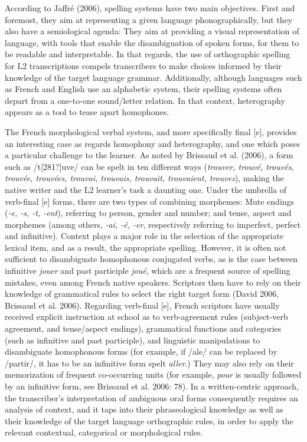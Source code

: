 \documentclass[11pt]{article}
\newenvironment{styleStandard}{\renewcommand\baselinestretch{1.0}\setlength\leftskip{0cm}\setlength\rightskip{0cm plus 1fil}\setlength\parindent{0cm}\setlength\parfillskip{0pt plus 1fil}\setlength\parskip{0in plus 1pt}\writerlistparindent\writerlistleftskip\leavevmode\normalfont\normalsize\writerlistlabel\ignorespaces}{\unskip\vspace{0.111in plus 0.0111in}\par}
\newcommand\writerlistleftskip{}
\newcommand\writerlistparindent{}
\newcommand\writerlistlabel{}
\begin{document}
\begin{styleStandard}
According to Jaffré (2006), spelling systems have two main objectives. First and foremost, they aim at representing a given language phonographically, but they also have a semiological agenda: They aim at providing a visual representation of language, with tools that enable the disambiguation of spoken forms, for them to be readable and interpretable. In that regards, the use of orthographic spelling for L2 transcriptions compels transcribers to make choices informed by their knowledge of the target language grammar. Additionally, although languages such as French and English use an alphabetic system, their spelling systems often depart from a one-to-one sound/letter relation. In that context, heterography appears as a tool to tease apart homophones. 
\end{styleStandard}

\begin{styleStandard}
The French morphological verbal system, and more specifically final [e], provides an interesting case as regards homophony and heterography, and one which poses a particular challenge to the learner. As noted by Brissaud et al. (2006), a form such as /t[281?]uve/ can be spelt in ten different ways (\textit{trouver, trouvé, trouvés, trouvée, trouvées, trouvai, trouvais, trouvait, trouvaient, trouvez}), making the native writer and the L2 learner’s task a daunting one. Under the umbrella of verb-final [e] forms, there are two types of combining morphemes: Mute endings (\textit{{}-e, -s, -t, -ent}), referring to person, gender and number; and tense, aspect and morphemes (among others, \textit{{}-ai, -é, -er}, respectively referring to imperfect, perfect and infinitive). Context plays a major role in the selection of the appropriate lexical item, and as a result, the appropriate spelling. However, it is often not sufficient to disambiguate homophonous conjugated verbs, as is the case between infinitive \textit{jouer} and past participle \textit{joué}, which are a frequent source of spelling mistakes, even among French native speakers. Scriptors then have to rely on their knowledge of grammatical rules to select the right target form (David 2006, Brissaud et al. 2006). Regarding verb-final [e], French scriptors have usually received explicit instruction at school as to verb-agreement rules (subject-verb agreement, and tense/aspect endings), grammatical functions and categories (such as infinitive and past participle), and linguistic manipulations to disambiguate homophonous forms (for example, if /ale/ can be replaced by /partir/, it has to be an infinitive form spelt \textit{aller}.) They may also rely on their memorization of frequent co-occurring units (for example, \textit{pour} is usually followed by an infinitive form, see Brissaud et al. 2006: 78). In a written-centric approach, the transcriber’s interpretation of ambiguous oral forms consequently requires an analysis of context, and it taps into their phraseological knowledge as well as their knowledge of the target language orthographic rules, in order to apply the relevant contextual, categorical or morphological rules.
\end{styleStandard}
\end{document}
